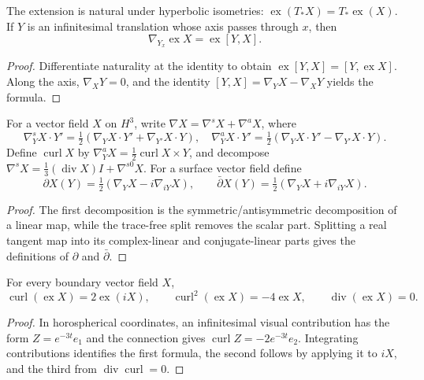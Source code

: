 \begin{proposition}
\label{thurston-ch11-extension-derivative}

The extension is natural under hyperbolic isometries:
$\operatorname{ex}(T_*X)=T_*\operatorname{ex}(X)$.  If $Y$ is an infinitesimal
translation whose axis passes through $x$, then
\[
 \nabla_{Y_x}\operatorname{ex}X=\operatorname{ex}[Y,X].
\]
\end{proposition}
\begin{proof}
\sketch Differentiate naturality at the identity to obtain
$\operatorname{ex}[Y,X]=[Y,\operatorname{ex}X]$.  Along the axis,
$\nabla_XY=0$, and the identity
$[Y,X]=\nabla_YX-\nabla_XY$ yields the formula.
\end{proof}

\begin{definition}
\label{thurston-ch11-derivative-decompositions}

For a vector field $X$ on $H^3$, write
$\nabla X=\nabla^sX+\nabla^aX$, where
\[
 \nabla^s_YX\cdot Y'=\tfrac12(\nabla_YX\cdot Y'+\nabla_{Y'}X\cdot Y),\quad
 \nabla^a_YX\cdot Y'=\tfrac12(\nabla_YX\cdot Y'-\nabla_{Y'}X\cdot Y).
\]
Define $\operatorname{curl}X$ by
$\nabla^a_YX=\frac12\operatorname{curl}X\times Y$, and decompose
$\nabla^sX=\frac13(\operatorname{div}X)I+\nabla^{s0}X$.
For a surface vector field define
\[
 \partial X(Y)=\tfrac12(\nabla_YX-i\nabla_{iY}X),\qquad
 \bar\partial X(Y)=\tfrac12(\nabla_YX+i\nabla_{iY}X).
\]
\end{definition}
\begin{proof}
\sketch The first decomposition is the symmetric/antisymmetric decomposition
of a linear map, while the trace-free split removes the scalar part.  Splitting
a real tangent map into its complex-linear and conjugate-linear parts gives
the definitions of $\partial$ and $\bar\partial$.
\end{proof}

\begin{proposition}
\label{thurston-ch11-extension-curl}

For every boundary vector field $X$,
\[
 \operatorname{curl}(\operatorname{ex}X)=2\operatorname{ex}(iX),\qquad
 \operatorname{curl}^2(\operatorname{ex}X)=-4\operatorname{ex}X,\qquad
 \operatorname{div}(\operatorname{ex}X)=0.
\]
\end{proposition}
\begin{proof}
\sketch In horospherical coordinates, an infinitesimal visual contribution
has the form $Z=e^{-3t}e_1$ and the connection gives
$\operatorname{curl}Z=-2e^{-3t}e_2$.  Integrating contributions identifies the
first formula, the second follows by applying it to $iX$, and the third from
$\operatorname{div}\operatorname{curl}=0$.
\end{proof}

